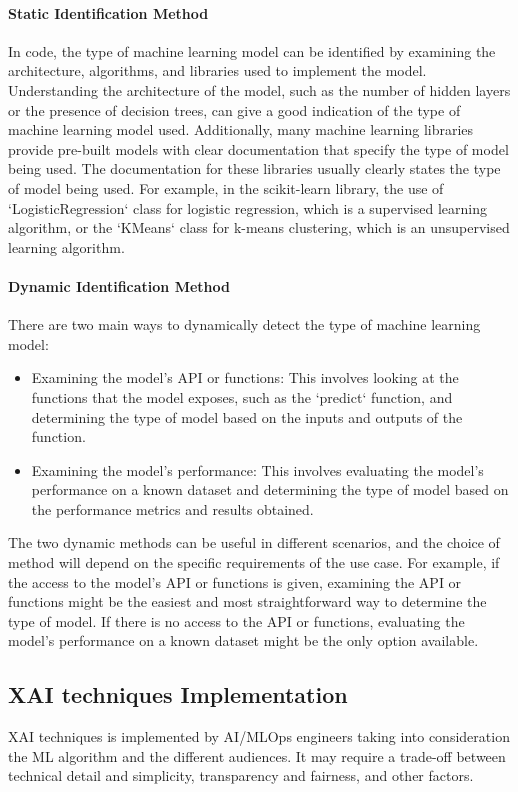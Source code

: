 \documentclass[conference]{IEEEtran}
\begin{document}
\paragraph{Static Identification Method} In code, the type of machine learning model can be identified by examining the architecture, algorithms, and libraries used to implement the model. Understanding the architecture of the model, such as the number of hidden layers or the presence of decision trees, can give a good indication of the type of machine learning model used. Additionally, many machine learning libraries provide pre-built models with clear documentation that specify the type of model being used. The documentation for these libraries usually clearly states the type of model being used. 
For example, in the scikit-learn library, the use of `LogisticRegression` class for logistic regression, which is a supervised learning algorithm, or the `KMeans` class for k-means clustering, which is an unsupervised learning algorithm.
\paragraph{Dynamic Identification Method}There are two main ways to dynamically detect the type of machine learning model:

\begin{itemize}
	\item Examining the model's API or functions: This involves looking at the functions that the model exposes, such as the `predict` function, and determining the type of model based on the inputs and outputs of the function.

	\item Examining the model's performance: This involves evaluating the model's performance on a known dataset and determining the type of model based on the performance metrics and results obtained.
\end{itemize}

The two dynamic methods can be useful in different scenarios, and the choice of method will depend on the specific requirements of the use case. For example, if the access to the model's API or functions is given, examining the API or functions might be the easiest and most straightforward way to determine the type of model. If there is no access to the API or functions, evaluating the model's performance on a known dataset might be the only option available.

\subsection{XAI techniques Implementation}
XAI techniques is implemented by AI/MLOps engineers taking into consideration the ML algorithm and the different audiences. It may require a trade-off between technical detail and simplicity, transparency and fairness, and other factors.
\end{document}
